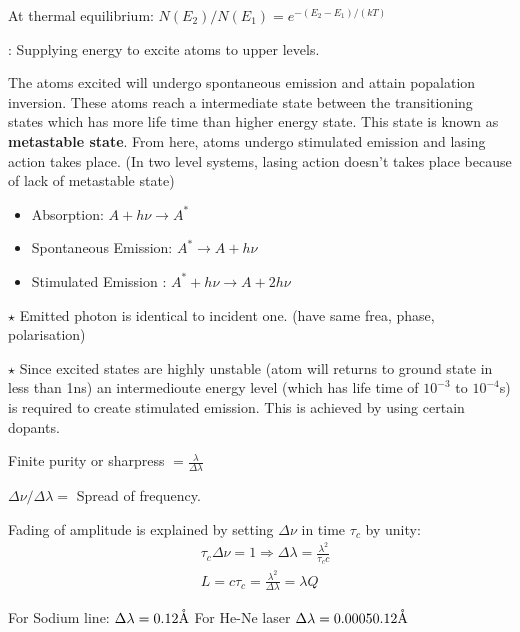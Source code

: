 \documentclass[12pt, a4paper]{article}
\begin{document}


At thermal equilibrium: $N\left(E_2\right) / N\left(E_1\right)=e ^ {-\left(E_2-E_1\right) / (kT)}$
\medskip

: Supplying energy to excite atoms to upper levels.


The atoms excited will undergo spontaneous emission and attain popalation inversion. These atoms reach a intermediate state between the transitioning states which has more life time than higher energy state. This state is known as \textbf{metastable state}. From here, atoms undergo stimulated emission and lasing action takes place. (In two level systems, lasing action doesn't takes place because of lack of metastable state)


\begin{itemize}
	\item Absorption: $A+h\nu \rightarrow A^{*}$
	\item Spontaneous Emission: $A^{*} \rightarrow A+h\nu$
	\item Stimulated Emission : $A^{*}+h\nu \rightarrow A+2 h\nu$
\end{itemize}
$\star$ Emitted photon is identical to incident one. (have same frea, phase, polarisation)

$\star$ Since excited states are highly unstable (atom will returns to ground state in less than 1ns) an intermedioute energy level (which has life time of $10^{-3}$ to $10^{-4}$s) is required to create stimulated emission. This is achieved by using certain dopants.



Finite purity or sharpress $=\frac{\lambda}{\Delta \lambda}$

$\Delta \nu / \Delta\lambda=$ Spread of frequency.

Fading of amplitude is explained by setting $\Delta\nu$ in time $\tau_c$ by unity:
$$
	\begin{aligned}
		 & \tau_c \Delta \nu=1 \Rightarrow \Delta \lambda=\frac{\lambda^2}{\tau_c c} \\
		 & L=c \tau_c=\frac{\lambda^2}{\Delta \lambda}= \lambda Q
	\end{aligned}
$$

For Sodium line: $\Delta \lambda = 0.12\mathring{\textrm{A}}$
For He-Ne laser $\Delta \lambda = 0.0005 0.12\mathring{\textrm{A}}$

\bigskip
\end{document}

